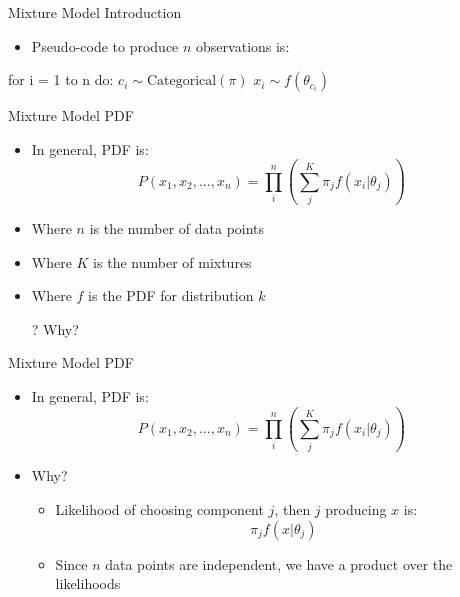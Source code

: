 \documentclass[aspectratio=169]{beamer}
\begin{document}
\begin{frame}[fragile]{Mixture Model Introduction}
\begin{itemize}
	\item Pseudo-code to produce $n$ observations is:
\end{itemize}
\begin{SQL}
for i = 1 to n do:
  $c_i \sim \textrm{Categorical}(\pi)$
  $x_i \sim f(\theta_{c_i})$
\end{SQL} 
\end{frame}
\begin{frame}{Mixture Model PDF}

\begin{itemize}
\item In general, PDF is:
$$P(x_1, x_2, ..., x_n) = \prod_i^n \left( \sum_j^K \pi_j f (x_i | \theta_j) \right)$$
\item Where $n$ is the number of data points
\item Where $K$ is the number of mixtures
\item Where $f$ is the PDF for distribution $k$
\item[?] Why?
\end{itemize}
\end{frame}
\begin{frame}{Mixture Model PDF}

\begin{itemize}
\item In general, PDF is:
$$P(x_1, x_2, ..., x_n) = \prod_i^n \left( \sum_j^K \pi_j f (x_i | \theta_j) \right)$$
\item Why?
\begin{itemize}
 \item Likelihood of choosing component $j$, then $j$ producing $x$ is:
			$$\pi_j f (x | \theta_j) $$
		\item Since $n$ data points are independent, we have a product over the likelihoods\end{itemize}
\end{itemize}
\end{frame}
\end{document}
